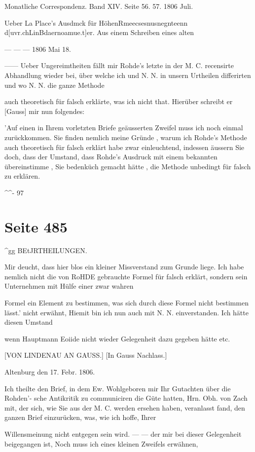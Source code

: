 \documentclass[10pt,a4paper]{article}
\begin{document}
Monatliche Correspondenz. Band XIV. Seite 56. 57. 1806 Juli.

Ueber La Place's Ausdmck für HöhenRmeecsesnusnegnteenn d[uvr.chLinBdaernoamue.t]er. Aus einem Schreiben eines alten

— — — 1806 Mai 18.

—— Ueber Ungereimtheiten fällt mir Rohde's letzte in der M. C. recensirte Abhandlung wieder bei, über welche ich und N. N. in unsern Urtheilen differirten und wo N. N. die ganze Methode

auch theoretisch für falsch erklärte, was ich nicht that. Hierüber schreibt er [Gauss] mir nun folgendes:

'Auf einen in Ihrem vorletzten Briefe geäusserten Zweifel muss ich noch einmal zurückkommen. Sie finden nemlich meine Gründe , warum ich Rohde's Methode auch theoretisch für falsch erklärt habe zwar einleuchtend, indessen äussern Sie doch, dass der Umstand, dass Rohde's Ausdruck mit einem bekannten übereinstimme , Sie bedenküch gemacht hätte , die Methode unbedingt für falsch zu erklären.

\textasciicircum{}\textasciicircum{}- 97


\newpage
\section*{Seite 485}
\textasciicircum{}gg BEtJRTHEILUNGEN.

Mir deucht, dass hier blos ein kleiner Missverstand zum Grunde liege. Ich habe nemlich nicht die von RoHDE gebrauchte Formel für falsch erklärt, sondern sein Unternehmen mit Hülfe einer zwar wahren

Formel ein Element zu bestimmen, was sich durch diese Formel nicht bestimmen lässt.' nicht erwähnt, Hiemit bin ich nun auch mit N. N. einverstanden. Ich hätte diesen Umstand

wenn Hauptmann Eoiide nicht wieder Gelegenheit dazu gegeben hätte etc.

[VON LINDENAU AN GAUSS.] [In Gauss Nachlass.]

Altenburg den 17. Febr. 1806.

Ich theilte den Brief, in dem Ew. Wohlgeboren mir Ihr Gutachten über die Rohden'- sche Antikritik zu communiciren die Güte hatten, Hrn. Obh. von Zach mit, der sich, wie Sie aus der M. C. werden ersehen haben, veranlasst fand, den ganzen Brief einzurücken, was, wie ich hoffe, Ihrer

Willensmeinung nicht entgegen sein wird. — — der mir bei dieser Gelegenheit beigegangen ist, Noch muss ich eines kleinen Zweifels erwähnen,
\end{document}
